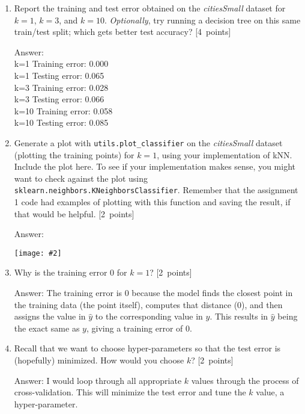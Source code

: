 \documentclass{article}
\newcommand{\blu}[1]{{\textcolor{blu}{#1}}}
\newenvironment{answer}{\par\begingroup\color{gre}Answer: }{\endgroup}
\let\ask\blu
\newcommand\pts[1]{\textcolor{pointscolour}{[#1~points]}}
\newcommand{\centerfig}[2]{\begin{center}\texttt{[image: \#2]}\end{center}}
\begin{document}
\begin{enumerate}
\begin{answer}
\begin{verbatim}
                # Ties for even split of nearest labels
                if (
                    numpy_k_nearest_labels.size % 2 == 0
                    and prediction == numpy_k_nearest_labels.size / 2
                ):
                    prediction = mode
                y_hat[i] = prediction
            return y_hat
        \end{verbatim}
        \end{answer}
        \item \ask{Report the training and test error} obtained on the \emph{citiesSmall} dataset for $k=1$, $k=3$, and $k=10$. \emph{Optionally}, try running a decision tree on this same train/test split; which gets better test accuracy? \pts{4}
        \begin{answer} \\
        k=1    Training error: 0.000 \\
        k=1    Testing error: 0.065 \\
        k=3    Training error: 0.028 \\
        k=3    Testing error: 0.066 \\
        k=10    Training error: 0.058 \\
        k=10    Testing error: 0.085
        \end{answer}
        \item Generate a plot with \texttt{utils.plot\_classifier} on the \emph{citiesSmall} dataset (plotting the training points) for $k=1$, using your implementation of kNN. \ask{Include the plot here.} To see if your implementation makes sense, you might want to check against the plot using \texttt{sklearn.neighbors.KNeighborsClassifier}. Remember that the assignment 1 code had examples of plotting with this function and saving the result, if that would be helpful. \pts{2}
        \begin{answer}
        \centerfig{.5}{figs/k1_graph.png}
        \end{answer}
        \item Why is the training error $0$ for $k=1$? \pts{2}
        \begin{answer}
        The training error is $0$ because the model finds the closest point in the training data (the point itself), computes that distance (0), and then assigns the value in $\hat{y}$ to the corresponding value in $y$. This results in $\hat{y}$ being the exact same as $y$, giving a training error of $0$. 
        \end{answer}
        \item Recall that we want to choose hyper-parameters so that the test error is (hopefully) minimized. How would you choose $k$? \pts{2}
        \begin{answer}
        I would loop through all appropriate $k$ values through the process of cross-validation. This will minimize the test error and tune the $k$ value, a hyper-parameter.
        \end{answer}
    \end{enumerate}
\end{document}
